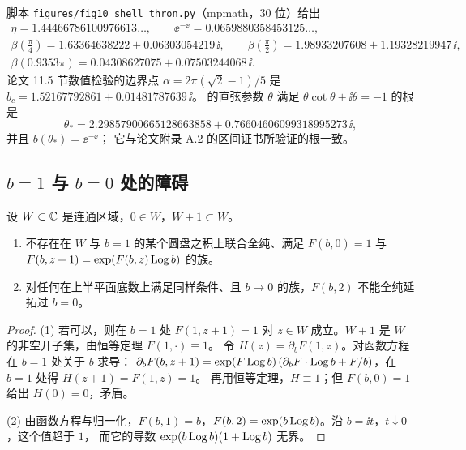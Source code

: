 \begin{example}[底数平面的几个数值]\label{ch10:ex:base-numbers}
脚本 \texttt{figures/fig10\_shell\_thron.py}（mpmath，30 位）给出
\[
\begin{gathered}
  \eta=1.44466786100976613\ldots,\qquad \ee^{-\ee}=0.0659880358453125\ldots,\\
  \beta(\tfrac\pi4)=1.63364638222+0.06303054219\,\ii,\qquad
  \beta(\tfrac\pi2)=1.98933207608+1.19328219947\,\ii,\\
  \beta(0.9353\pi)=0.04308627075+0.07503244068\,\ii .
\end{gathered}
\]
论文 11.5 节数值检验的边界点 $\alpha=2\pi(\sqrt2-1)/5$ 是 $b_c=1.52167792861+0.01481787639\,\ii$。
 的直弦参数 $\theta$ 满足 $\theta\cot\theta+\ii\theta=-1$ 的根是
\[
  \theta_*=2.29857900665128663858+0.76604606099318995273\,\ii ,
\]
并且 $b(\theta_*)=\ee^{-\ee}$；
它与论文附录 A.2 的区间证书所验证的根一致。
\end{example}

\subsection{$b=1$ 与 $b=0$ 处的障碍}

\begin{proposition}\label{ch10:prop:obstruction}
设 $W\subset\mathbb{C}$ 是连通区域，$0\in W$，$W+1\subset W$。
\begin{enumerate}
\item 不存在在 $W$ 与 $b=1$ 的某个圆盘之积上联合全纯、满足 $F(b,0)=1$ 与 $F(b,z+1)=\exp(F(b,z)\operatorname{Log} b)$ 的族。
\item 对任何在上半平面底数上满足同样条件、且 $b\to0$ 的族，$F(b,2)$ 不能全纯延拓过 $b=0$。
\end{enumerate}
\end{proposition}

\begin{proof}
(1) 若可以，则在 $b=1$ 处 $F(1,z+1)=1$ 对 $z\in W$ 成立。$W+1$ 是 $W$ 的非空开子集，由恒等定理 $F(1,\cdot)\equiv1$。
令 $H(z)=\partial_bF(1,z)$。对函数方程在 $b=1$ 处关于 $b$ 求导：
$\partial_bF(b,z+1)=\exp(F\operatorname{Log} b)\,(\partial_bF\cdot\operatorname{Log} b+F/b)$，在 $b=1$ 处得 $H(z+1)=F(1,z)=1$。
再用恒等定理，$H\equiv1$；但 $F(b,0)=1$ 给出 $H(0)=0$，矛盾。

(2) 由函数方程与归一化，$F(b,1)=b$，$F(b,2)=\exp(b\operatorname{Log} b)$。沿 $b=\ii t$，$t\downarrow0$，这个值趋于 $1$，
而它的导数 $\exp(b\operatorname{Log} b)(1+\operatorname{Log} b)$ 无界。
\end{proof}

